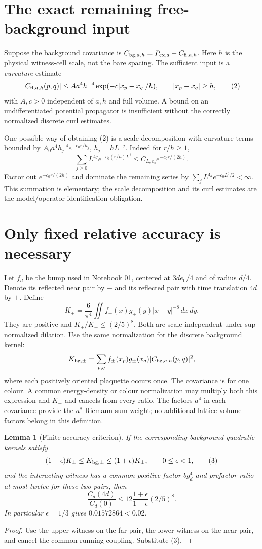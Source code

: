 \documentclass[11pt]{article}
\newtheorem{lemma}{Lemma}
\begin{document}
\section{The exact remaining free-background input}

Suppose the background covariance is
$C_{{\rm bg},a,h}=P_{{\rm ex},a}-C_{{\rm fl},a,h}$.
Here $h$ is the physical witness-cell scale, not the bare spacing.
The sufficient input is a \emph{curvature} estimate
\[
|C_{{\rm fl},a,h}(p,q)|
\leq A a^4h^{-4}\exp(-c|x_p-x_q|/h),
\qquad |x_p-x_q|\geq h,
\tag{2}
\]
with $A,c>0$ independent of $a,h$ and full volume.
A bound on an undifferentiated potential propagator is insufficient
without the correctly normalized discrete curl estimates.

One possible way of obtaining (2) is a scale decomposition with
curvature terms bounded by
$A_0a^4h_j^{-4}e^{-c_0r/h_j}$, $h_j=hL^{-j}$.
Indeed for $r/h\geq1$,
\[
\sum_{j\geq0}L^{4j}e^{-c_0(r/h)L^j}
\leq C_{L,c_0}e^{-c_0r/(2h)}.
\]
Factor out $e^{-c_0r/(2h)}$ and dominate the remaining series by
$\sum_jL^{4j}e^{-c_0L^j/2}<\infty$.
This summation is elementary; the scale decomposition and its
curl estimates are the model/operator identification obligation.

\section{Only fixed relative accuracy is necessary}

Let $f_d$ be the bump used in Notebook 01, centered at $3de_0/4$
and of radius $d/4$. Denote its reflected near pair by $-$ and its
reflected pair with time translation $4d$ by $+$.
Define
\[
K_\pm=\frac6{\pi^4}
\iint f_\pm(x)g_\pm(y)|x-y|^{-8}\,dx\,dy.
\]
They are positive and $K_+/K_-\leq(2/5)^8$.
Both are scale independent under sup-normalized dilation.
Use the same normalization for the discrete background kernel:
\[
 K_{{\rm bg},\pm}=\sum_{p,q}
 f_\pm(x_p)g_\pm(x_q)
 |C_{{\rm bg},a,h}(p,q)|^2,
\]
where each positively oriented plaquette occurs once. The covariance is
for one colour. A common energy-density or colour normalization may
multiply both this expression and $K_\pm$ and cancels from every ratio.
The factors $a^4$ in each covariance provide the $a^8$ Riemann-sum
weight; no additional lattice-volume factors belong in this definition.

\begin{lemma}[Finite-accuracy criterion]
If the corresponding background quadratic kernels satisfy
\[
(1-\epsilon)K_\pm\leq K_{{\rm bg},\pm}
\leq(1+\epsilon)K_\pm,\qquad 0\leq\epsilon<1,
\tag{3}
\]
and the interacting witness has a common positive factor $b g_d^4$
and prefactor ratio at most twelve for these two pairs, then
\[
\frac{C_d(4d)}{C_d(0)}
\leq12\frac{1+\epsilon}{1-\epsilon}(2/5)^8.
\tag{4}
\]
In particular $\epsilon=1/3$ gives $0.01572864<0.02$.
\end{lemma}
\begin{proof}
Use the upper witness on the far pair, the lower witness on the near
pair, and cancel the common running coupling. Substitute (3).
\end{proof}
\end{document}
